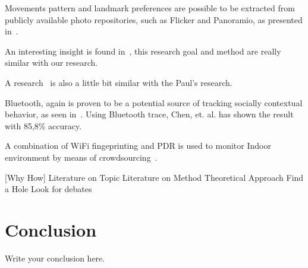 \documentclass{article}
\begin{document}
Movements pattern and landmark preferences are possible to be extracted from publicly available photo repositories, such as Flicker and Panoramio, as presented in~\cite{thesis026}.

An interesting insight is found in~\cite{thesis031}, this research goal and method are really similar with our research.

A research~\cite{thesis030} is also a little bit similar with the Paul's research.

Bluetooth, again is proven to be a potential source of tracking socially contextual behavior, as seen in~\cite{thesis028}. Using Bluetooth trace, Chen, et. al. has shown the result with 85,8\% accuracy.

A combination of WiFi fingeprinting and PDR is used to monitor Indoor environment by means of crowdsourcing~\cite{thesis020}.

[Why How]
Literature on Topic
Literature on Method
Theoretical Approach
Find a Hole
Look for debates

\section{Conclusion}
Write your conclusion here.

{}

\end{document}
